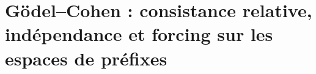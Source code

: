 \chapter{Gödel--Cohen : consistance relative, indépendance et forcing sur les espaces de préfixes}
\label{chap:p3-final:55:godel_cohen}

